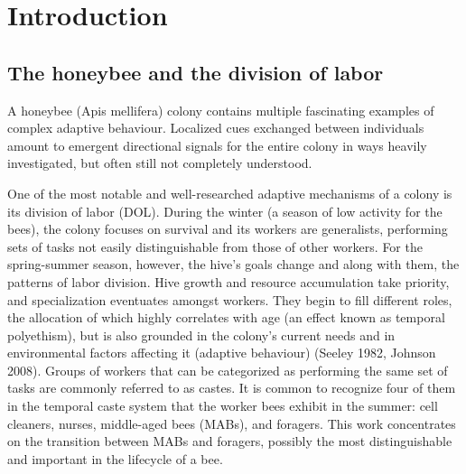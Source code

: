 
\chapter{Introduction}  %

\ifpdf
    \graphicspath{{Chapters/Chapter1/Figs/Raster/}{Chapters/Chapter1/Figs/PDF/}{Chapters/Chapter1/Figs/}}
\else
    \graphicspath{{Chapters/Chapter1/Figs/Vector/}{Chapters/Chapter1/Figs/}}
\fi


\section{The honeybee and the division of labor} %
A honeybee (Apis mellifera) colony contains multiple fascinating examples of complex adaptive behaviour. 
Localized cues exchanged between individuals amount to emergent directional signals for the entire colony 
in ways heavily investigated, but often still not completely understood. 

One of the most notable and well-researched adaptive mechanisms of a colony is its division of labor (DOL). 
During the winter (a season of low activity for the bees), the colony focuses on survival 
and its workers are generalists, performing sets of tasks not easily distinguishable from those of other workers. 
For the spring-summer season, however, the hive’s goals change and along with them, the patterns of labor division. 
Hive growth and resource accumulation take priority, and specialization eventuates amongst workers. 
They begin to fill different roles, the allocation of which highly correlates with age (an effect 
known as temporal polyethism), but is also grounded in the colony’s current needs and in environmental 
factors affecting it (adaptive behaviour) \citep{Aup91} (Seeley 1982, Johnson 2008). Groups of workers that can be 
categorized as performing the same set of tasks are commonly referred to as castes. It is common to recognize 
four of them in the temporal caste system that the worker bees exhibit in the summer: 
cell cleaners, nurses, middle-aged bees (MABs), and foragers. 
This work concentrates on the transition between MABs and foragers, 
possibly the most distinguishable and important in the lifecycle of a bee.


